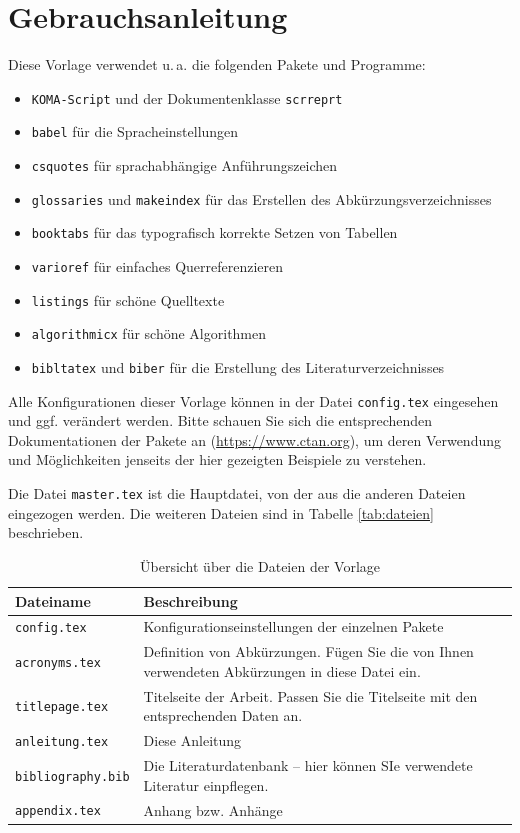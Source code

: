 \chapter{Gebrauchsanleitung}
Diese Vorlage verwendet u.\,a. die folgenden Pakete und Programme: 
\begin{itemize}
	\item\texttt{KOMA-Script} und der Dokumentenklasse \texttt{scrreprt}
	\item \texttt{babel} für die Spracheinstellungen
	\item \texttt{csquotes} für sprachabhängige Anführungszeichen 
	\item \texttt{glossaries} und \texttt{makeindex} für das Erstellen des Abkürzungsverzeichnisses 
	\item \texttt{booktabs} für das typografisch korrekte Setzen von Tabellen 
	\item \texttt{varioref} für einfaches Querreferenzieren 
	\item \texttt{listings} für schöne Quelltexte
	\item \texttt{algorithmicx} für schöne Algorithmen
	\item \texttt{bibltatex} und \texttt{biber} für die Erstellung des Literaturverzeichnisses 
\end{itemize}
Alle Konfigurationen dieser Vorlage können in der Datei \texttt{config.tex} eingesehen und ggf. verändert werden. Bitte schauen Sie sich die entsprechenden Dokumentationen 
der Pakete an (\url{https://www.ctan.org}), um deren Verwendung und Möglichkeiten jenseits der hier gezeigten Beispiele zu verstehen.

Die Datei \texttt{master.tex} ist die Hauptdatei, von der aus die anderen Dateien eingezogen werden. Die weiteren Dateien sind in Tabelle \vref{tab:dateien} beschrieben.
 
\begin{table}
	\centering
\begin{tabular}{lp{10cm}}
	\textbf{Dateiname} & \textbf{Beschreibung}\\\toprule
	\texttt{config.tex} & Konfigurationseinstellungen der einzelnen Pakete\\
	\texttt{acronyms.tex} & Definition von Abkürzungen. Fügen Sie die von Ihnen verwendeten Abkürzungen in diese Datei ein.\\
	\texttt{titlepage.tex} & Titelseite der Arbeit. Passen Sie die Titelseite mit den entsprechenden Daten an.\\
	\texttt{anleitung.tex} & Diese Anleitung\\ 
	\texttt{bibliography.bib}&  Die Literaturdatenbank -- hier können SIe verwendete Literatur einpflegen.\\
	\texttt{appendix.tex} & Anhang bzw. Anhänge \\\bottomrule
\end{tabular}
\caption{\label{tab:dateien}Übersicht über die Dateien der Vorlage}
\end{table}

